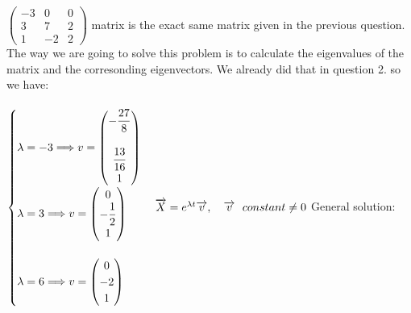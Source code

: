 \documentclass[fleqn]{article}
\begin{document}
\begin{enumerate}
      \textcolor{hwColor}{
        $
        \begin{pmatrix}
          -3 & 0 & 0
          \\
          3 & 7 & 2 
          \\
          1 & -2 & 2
        \end{pmatrix}
        $ matrix is the exact same matrix given in the previous question. The way we are going to 
        solve this problem is to calculate the eigenvalues of the matrix and the corresonding
        eigenvectors. We already did that in question 2. so we have:
        \\
        \\
        $
          \begin{cases}
            \lambda=-3 \Longrightarrow v=\begin{pmatrix}
              -\dfrac{27}{8}
              \\
              \\
              \dfrac{13}{16}
              \\
              1
            \end{pmatrix}
            \\
            \lambda=3 \Longrightarrow v=\begin{pmatrix}
              0
              \\
              -\dfrac{1}{2}
              \\
              1
            \end{pmatrix}
            \\
            \\
            \lambda=6 \Longrightarrow v=\begin{pmatrix}
              0
              \\
              -2
              \\
              1
            \end{pmatrix}
          \end{cases}
          \\
          \\
          \\
          \overrightarrow{X}=e^{\lambda t} \overrightarrow{v}, ~~~ \overrightarrow{v} ~~ constant \neq 0
          \\
          \\
          \\
        $
        General solution:
        \\
        \\
}
\end{enumerate}
\end{document}
